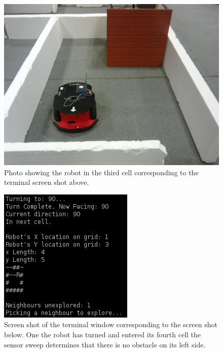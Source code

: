 \documentclass[a4paper,12pt]{article}
\begin{document}
\begin{figure}[H]
\includegraphics[scale=0.13]{RealS3.jpg}
\caption{Photo showing the robot in the third cell corresponding to the terminal screen shot above.}
\end{figure}

\begin{figure}[H]
\includegraphics[scale=1.0]{RealRunT4.png}
\caption{Screen shot of the terminal window corresponding to the screen shot below. One the robot has turned and entered its fourth cell the sensor sweep determines that there is no obstacle on its left side.}
\end{figure}
\end{document}
